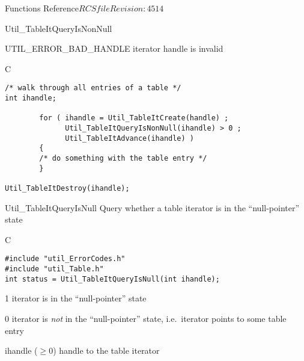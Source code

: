 \begin{cactuspart}{ Functions Reference}{$RCSfile$}{$Revision: 4514 $}
\begin{FunctionDescription}{Util\_TableItQueryIsNonNull}
\begin{ErrorSection}
\begin{Error}{UTIL\_ERROR\_BAD\_HANDLE}
iterator handle is invalid
\end{Error}
\end{ErrorSection}

\begin{ExampleSection}
\begin{Example}{C}
\begin{verbatim}
/* walk through all entries of a table */
int ihandle;

        for ( ihandle = Util_TableItCreate(handle) ;
              Util_TableItQueryIsNonNull(ihandle) > 0 ;
              Util_TableItAdvance(ihandle) )
        {
        /* do something with the table entry */
        }

Util_TableItDestroy(ihandle);
\end{verbatim}
\end{Example}
\end{ExampleSection}
\end{FunctionDescription}


\begin{FunctionDescription}{Util\_TableItQueryIsNull}
\label{Util-TableItQueryIsNull}
Query whether a table iterator is in the ``null-pointer'' state

\begin{SynopsisSection}
\begin{Synopsis}{C}
\begin{verbatim}
#include "util_ErrorCodes.h"
#include "util_Table.h"
int status = Util_TableItQueryIsNull(int ihandle);
\end{verbatim}
\end{Synopsis}
\end{SynopsisSection}

\begin{ResultSection}
\begin{Result}{\rm 1}
iterator is in the ``null-pointer'' state
\end{Result}
\begin{Result}{\rm 0}
iterator is {\em not\/} in the ``null-pointer'' state,
i.e.\ iterator points to some table entry
\end{Result}
\end{ResultSection}

\begin{ParameterSection}
\begin{Parameter}{ihandle ($\ge 0$)}
handle to the table iterator
\end{Parameter}
\end{ParameterSection}


\end{FunctionDescription}
\end{cactuspart}
